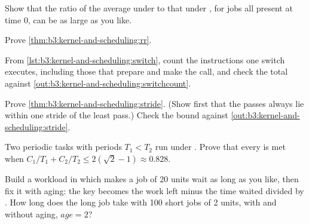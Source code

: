 \begin{exercise}[$\star\star$]\label{exo:b3:kernel-and-scheduling:7}
Show that the ratio of the average  under  to that under , for jobs all present at time 0, can be as large as you like.
\end{exercise}

\begin{exercise}[$\star\star$]\label{exo:b3:kernel-and-scheduling:8}
Prove \cref{thm:b3:kernel-and-scheduling:rr}.
\end{exercise}

\begin{exercise}[$\star\star$]\label{exo:b3:kernel-and-scheduling:9}
From \cref{lst:b3:kernel-and-scheduling:switch}, count the instructions one switch executes, including those that prepare and make the call, and check the total against \cref{out:b3:kernel-and-scheduling:switchcount}.
\end{exercise}

\begin{exercise}[$\star\star\star$]\label{exo:b3:kernel-and-scheduling:10}
Prove \cref{thm:b3:kernel-and-scheduling:stride}. (Show first that the passes always lie within one stride of the least pass.) Check the bound against \cref{out:b3:kernel-and-scheduling:stride}.
\end{exercise}

\begin{exercise}[$\star\star\star$]\label{exo:b3:kernel-and-scheduling:11}
Two periodic tasks with periods $T_1 < T_2$ run under . Prove that every  is met when $C_1/T_1 + C_2/T_2 \le 2(\sqrt{2} - 1) \approx 0.828$.
\end{exercise}

\begin{exercise}[$\star\star\star$]\label{exo:b3:kernel-and-scheduling:12}
Build a workload in which  makes a job of 20 units wait as long as you like, then fix it with aging: the key becomes the work left minus the time waited divided by . How long does the long job take with 100 short jobs of 2 units, with and without aging, $\mathit{age} = 2$?
\end{exercise}

